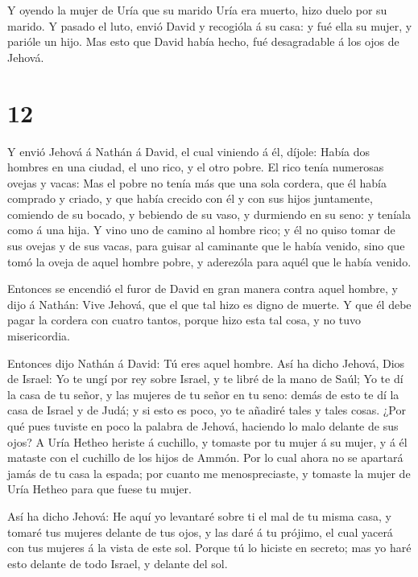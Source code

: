  Y oyendo la mujer de Uría que su marido Uría era muerto,
hizo duelo por su marido.  Y pasado el luto, envió David y
recogióla á su casa: y fué ella su mujer, y parióle un hijo. Mas esto
que David había hecho, fué desagradable á los ojos de Jehová.

\hypertarget{section-11}{%
\section{12}\label{section-11}}

 Y envió Jehová á Nathán á David, el cual viniendo á él,
díjole: Había dos hombres en una ciudad, el uno rico, y el otro pobre.
 El rico tenía numerosas ovejas y vacas:  Mas el
pobre no tenía más que una sola cordera, que él había comprado y criado,
y que había crecido con él y con sus hijos juntamente, comiendo de su
bocado, y bebiendo de su vaso, y durmiendo en su seno: y teníala como á
una hija.  Y vino uno de camino al hombre rico; y él no
quiso tomar de sus ovejas y de sus vacas, para guisar al caminante que
le había venido, sino que tomó la oveja de aquel hombre pobre, y
aderezóla para aquél que le había venido.

 Entonces se encendió el furor de David en gran manera
contra aquel hombre, y dijo á Nathán: Vive Jehová, que el que tal hizo
es digno de muerte.  Y que él debe pagar la cordera con
cuatro tantos, porque hizo esta tal cosa, y no tuvo misericordia.

 Entonces dijo Nathán á David: Tú eres aquel hombre. Así ha
dicho Jehová, Dios de Israel: Yo te ungí por rey sobre Israel, y te
libré de la mano de Saúl;  Yo te dí la casa de tu señor, y
las mujeres de tu señor en tu seno: demás de esto te dí la casa de
Israel y de Judá; y si esto es poco, yo te añadiré tales y tales cosas.
 ¿Por qué pues tuviste en poco la palabra de Jehová,
haciendo lo malo delante de sus ojos? A Uría Hetheo heriste á cuchillo,
y tomaste por tu mujer á su mujer, y á él mataste con el cuchillo de los
hijos de Ammón.  Por lo cual ahora no se apartará jamás de
tu casa la espada; por cuanto me menospreciaste, y tomaste la mujer de
Uría Hetheo para que fuese tu mujer.

 Así ha dicho Jehová: He aquí yo levantaré sobre ti el mal
de tu misma casa, y tomaré tus mujeres delante de tus ojos, y las daré á
tu prójimo, el cual yacerá con tus mujeres á la vista de este sol.
 Porque tú lo hiciste en secreto; mas yo haré esto delante
de todo Israel, y delante del sol.

